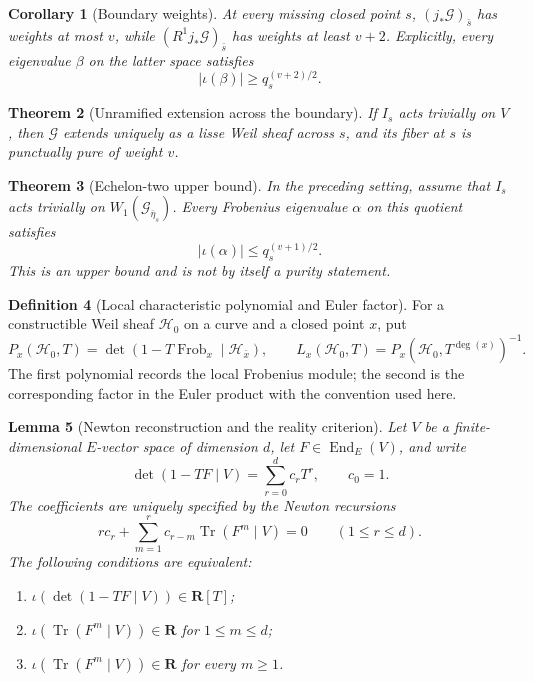 \documentclass[10pt]{article}
\newtheorem{theorem}{Theorem}[section]
\newtheorem{lemma}[theorem]{Lemma}
\newtheorem{corollary}[theorem]{Corollary}
\theoremstyle{definition}
\newtheorem{definition}[theorem]{Definition}
\newcommand{\Frob}{\operatorname{Frob}}
\begin{document}
\begin{corollary}[Boundary weights]
At every missing closed point \(s\),
\((j_*\mathcal G)_{\bar s}\) has weights at most \(v\), while
\((R^1j_*\mathcal G)_{\bar s}\) has weights at least \(v+2\).  Explicitly,
every eigenvalue \(\beta\) on the latter space satisfies
\[
                 |\iota(\beta)|\ge q_s^{(v+2)/2}.
\]
\end{corollary}

\begin{theorem}[Unramified extension across the boundary]
If \(I_s\) acts trivially on \(V\), then \(\mathcal G\) extends uniquely as
a lisse Weil sheaf across \(s\), and its fiber at \(s\) is punctually pure
of weight \(v\).
\end{theorem}

\begin{theorem}[Echelon-two upper bound]
In the preceding setting, assume that \(I_s\) acts trivially on
\(W_1(\mathcal G_{\bar\eta_s})\).  Every Frobenius eigenvalue \(\alpha\)
on this quotient satisfies
\[
             |\iota(\alpha)|\le q_s^{(v+1)/2}.
\]
This is an upper bound and is not by itself a purity statement.
\end{theorem}

\begin{definition}[Local characteristic polynomial and Euler factor]
For a constructible Weil sheaf \(\mathcal H_0\) on a curve and a closed
point \(x\), put
\[
 P_x(\mathcal H_0,T)=
 \det(1-T\Frob_x\mid\mathcal H_{\bar x}),\qquad
 L_x(\mathcal H_0,T)=P_x(\mathcal H_0,T^{\deg(x)})^{-1}.
\]
The first polynomial records the local Frobenius module; the second is the
corresponding factor in the Euler product with the convention used here.
\end{definition}

\begin{lemma}[Newton reconstruction and the reality criterion]
Let \(V\) be a finite-dimensional \(E\)-vector space of dimension \(d\),
let \(F\in\operatorname{End}_E(V)\), and write
\[
 \det(1-TF\mid V)=\sum_{r=0}^{d}c_rT^r,
 \qquad c_0=1.
\]
The coefficients are uniquely specified by the Newton recursions
\[
 r c_r+\sum_{m=1}^{r}c_{r-m}\operatorname{Tr}(F^m\mid V)=0
 \qquad(1\leq r\leq d).
\]
The following conditions are equivalent:
\begin{enumerate}
\item \(\iota(\det(1-TF\mid V))\in\mathbf R[T]\);
\item \(\iota(\operatorname{Tr}(F^m\mid V))\in\mathbf R\) for
      \(1\leq m\leq d\);
\item \(\iota(\operatorname{Tr}(F^m\mid V))\in\mathbf R\) for every
      \(m\geq1\).
\end{enumerate}
\end{lemma}
\end{document}
